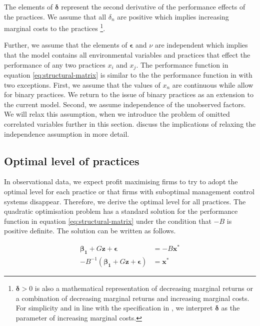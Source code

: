 \documentclass[12pt]{article}
\begin{document}
The elements of $\mathbf{\delta}$ represent the second derivative of the performance effects of the practices. We assume that all $\delta_n$ are positive which implies increasing marginal costs to the practices  \footnote{$\mathbf{\delta} > 0$ is also a mathematical representation of decreasing marginal returns or a combination of decreasing marginal returns and increasing marginal  costs. For simplicity and in line with the specification in \citet{Grabner2013}, we interpret $\mathbf{\delta}$ as the parameter of  increasing marginal costs.}. 

Further, we assume that the elements of $\mathbf{\epsilon}$ and $\nu$ are independent which implies that the model contains all environmental variables and practices that effect the performance of any two practices $x_i$ and $x_j$. The performance function in equation \eqref{eq:structural-matrix} is similar to the the performance function in \citet{Kretschmer2012} with two exceptions. First, we assume that the values of $x_n$ are continuous while \citet{Kretschmer2012} allow for binary practices. We return to the issue of binary practices as an extension to the current model. Second, we assume independence of the unobserved factors. We will relax this assumption, when we introduce the problem of omitted correlated variables further in this section. \citet{Athey1998} discuss the implications of relaxing the independence assumption in more detail. 

\subsection{Optimal level of practices}\label{optimal-practices}

In observational data, we expect profit maximising firms to try to adopt the optimal level for each practice or that firms with suboptimal management control systems disappear. Therefore, we derive the optimal level for all practices. The quadratic optimisation problem has a standard solution for the performance function in equation \eqref{eq:structural-matrix} under the condition that $-B$ is positive definite. The solution can be written as follows.

\begin{equation} \label{eq:optimal-matrix}
\begin{aligned} 
    \mathbf{\beta_1} + G \mathbf{z} + \mathbf{\epsilon} & = -B \mathbf{x^*} \\
    - B^{-1} (\mathbf{\beta_1} +  G \mathbf{z} + \mathbf{\epsilon})  & = \mathbf{x^*}
\end{aligned}
\end{equation}
\end{document}
